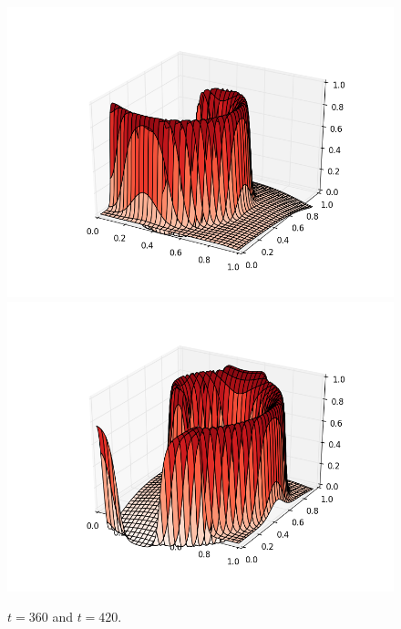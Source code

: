 \documentclass[12pt]{article}
\begin{document}
\begin{figure}[H]
\includegraphics[scale=0.4]{partc_fig_frames/partc_fig13.png}%
\includegraphics[scale=0.4]{partc_fig_frames/partc_fig15.png}
\caption{$t=360$ and $t=420$.}
\end{figure}
\end{document}
